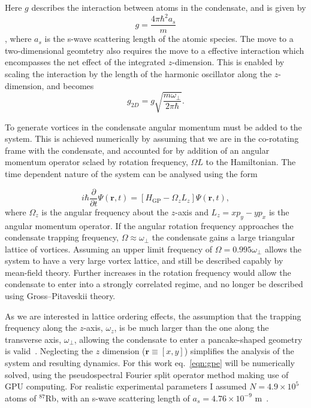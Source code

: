 Here $g$ describes the interaction between atoms in the condensate, and is given by \begin{equation}
g = \frac{4\pi\hbar^2a_s}{m}
\end{equation},
where $a_s$ is the s-wave scattering length of the atomic species. The move to a two-dimensional geomtetry also requires the move to a effective interaction which encompasses the net effect of the integrated $z$-dimension. This is enabled by scaling the interaction by the length of the harmonic oscillator along the $z$-dimension, and becomes
\begin{equation}
g_{2D} = g\sqrt{\frac{m\omega_\perp}{2\pi\hbar}}.
\end{equation}

To generate vortices in the condensate angular momentum must be added to the system. This is achieved numerically by assuming that we are in the co-rotating frame with the condensate, and accounted for by addition of an angular momentum operator sclaed by rotation frequency, $\Omega L$ to the Hamiltonian. The time dependent nature of the system can be analysed using the form

\begin{equation}\label{eqn:gpe}
	i\hbar\frac{\partial}{\partial t}\Psi(\mathbf{r},t) = \left[ H_{\text{GP}}  -  \Omega_z L_z \right] \Psi(\mathbf{r},t),
\end{equation}
where $\Omega_z$ is the angular frequency about the $z$-axis and $L_z = xp_y - yp_x$ is the angular momentum operator. If the angular rotation frequency approaches the condensate trapping frequency, $\Omega \approx \omega_\perp$ the condensate gains a large triangular lattice of vortices. Assuming an upper limit frequency of $\Omega = 0.995\omega_\perp$ allows the system to have a very large vortex lattice, and still be described capably by mean-field theory. Further increases in the rotation frequency would allow the condensate to enter into a strongly correlated regime, and no longer be described using Gross--Pitaveskii theory.

As we are interested in lattice ordering effects, the assumption that the trapping frequency along the $z$-axis, $\omega_z$, is be much larger than the one along the transverse axis, $\omega_\perp$,  allowing the condensate to enter a pancake-shaped geometry is valid~\cite{BEC:Fetter_revmodphys_2009}. Neglecting the $z$ dimension ($\textbf{r}\equiv [x,y]$) simplifies the analysis of the system and resulting dynamics. For this work eq.~\eqref{eqn:gpe} will be numerically solved, using the pseudospectral Fourier split operator method making use of GPU computing\cite{NUMERICS}. For realistic experimental parameters I assumed  $N=4.9\times 10^5$ atoms of $^{87}$Rb, with an s-wave scattering length of $a_s=4.76\times10^{-9}$ m~\cite{BEC:Roberts_prl_1998}.

